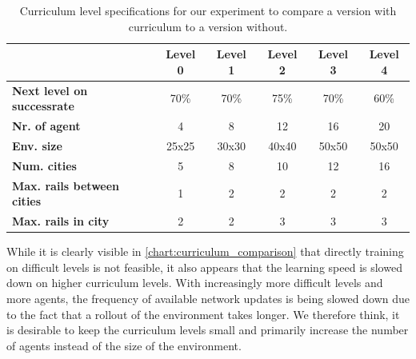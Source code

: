 \begin{table}
	\centering
	\begin{tabular}{ |l|c|c|c|c|c| } 
		\hline
		& \textbf{Level 0} 
		& \textbf{Level 1}  
		& \textbf{Level 2} 
		& \textbf{Level 3} 
		& \textbf{Level 4}\\
		\hline
		\textbf{Next level on successrate} & 70\% & 70\% & 75\% & 70\% & 60\% \\  
		\textbf{Nr. of agent} & 4 & 8 & 12 & 16 & 20 \\  
		\textbf{Env. size} & 25x25 & 30x30  & 40x40 & 50x50 & 50x50 \\ 
		\textbf{Num. cities} & 5 & 8 & 10  & 12 & 16 \\ 
		\textbf{Max. rails between cities} & 1 & 2 & 2 & 2 & 2  \\ 
		\textbf{Max. rails in city} & 2 & 2 & 3 & 3 & 3  \\ 
		\hline
	\end{tabular}
	\label{table:curriculum_data}
	\caption{Curriculum level specifications for our experiment to compare a version with curriculum to a version without.}
\end{table}
While it is clearly visible in \autoref{chart:curriculum_comparison} that directly training on difficult levels is not feasible, it also appears that the learning speed is slowed down on higher curriculum levels. With increasingly more difficult levels and more agents, the frequency of available network updates is being slowed down due to the fact that a rollout of the environment takes longer. We therefore think, it is desirable to keep the curriculum levels small and primarily increase the number of agents instead of the size of the environment.


